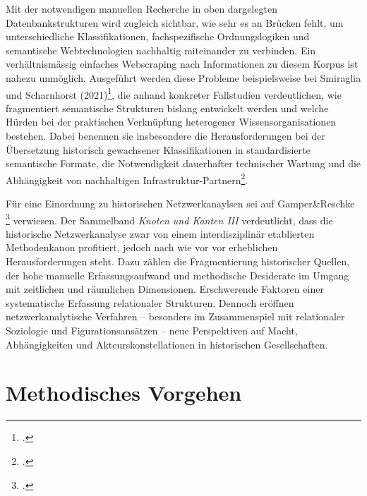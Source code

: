 \documentclass[12pt, a4paper, ngerman, bidi=default]{article}
\let\cite\footcite
\begin{document}
Mit der notwendigen manuellen Recherche in oben dargelegten Datenbankstrukturen wird zugleich sichtbar, wie sehr es an Brücken fehlt, 
um unterschiedliche Klassifikationen, fachspezifische Ordnungslogiken und semantische Webtechnologien nachhaltig miteinander zu verbinden. Ein verhältnismässig einfaches
Webscraping nach Informationen zu diesem Korpus ist nahezu unmöglich. Ausgeführt werden diese Probleme beispielsweise bei 
Smiraglia und Scharnhorst (2021)\cite[vgl.][]{richard_linking_2022}, 
 die anhand konkreter Fallstudien verdeutlichen, wie fragmentiert semantische Strukturen bislang entwickelt werden 
 und welche Hürden bei der praktischen Verknüpfung heterogener Wissensorganisationen bestehen. Dabei benennen sie insbesondere die 
 Herausforderungen bei der Übersetzung historisch gewachsener Klassifikationen in standardisierte semantische Formate, 
 die Notwendigkeit dauerhafter technischer Wartung und die Abhängigkeit von nachhaltigen Infrastruktur-Partnern\cite[vgl.][Kap.~2 und 5]{richard_linking_2022}.

Für eine Einordnung zu historischen Netzwerkanaylsen sei auf Gamper\&Reschke \cite{gamper_knoten_2015} verwiesen. Der Sammelband
\textit{Knoten und Kanten III} verdeutlicht, dass die historische Netzwerkanalyse zwar von einem interdisziplinär etablierten Methodenkanon 
profitiert, jedoch nach wie vor vor erheblichen Herausforderungen steht. Dazu zählen die Fragmentierung historischer Quellen, der hohe manuelle 
Erfassungsaufwand und methodische Desiderate im Umgang mit zeitlichen und räumlichen Dimensionen. Erschwerende Faktoren einer systematische Erfassung 
relationaler Strukturen. Dennoch eröffnen netzwerkanalytische Verfahren – besonders im Zusammenspiel mit relationaler Soziologie 
und Figurationsansätzen – neue Perspektiven auf Macht, Abhängigkeiten und Akteurskonstellationen in historischen Gesellschaften.





\section{Methodisches Vorgehen}
\end{document}

